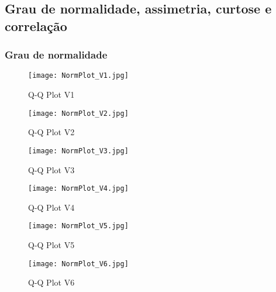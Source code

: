 \subsection[Subsection]{Grau de normalidade, assimetria, curtose e correlação}
\begin{frame}[shrink=30]
    \frametitle{Grau de normalidade}
    \vspace{3em}
    \begin{figure}[!tbp]
        \centering
            \begin{minipage}[b]{0.25\textwidth}
                \texttt{[image: NormPlot\_V1.jpg]}
                \caption{Q-Q Plot V1}
            \end{minipage}
            \begin{minipage}[b]{0.25\textwidth}
                \texttt{[image: NormPlot\_V2.jpg]}
                \caption{Q-Q Plot V2}
            \end{minipage}
            \begin{minipage}[b]{0.25\textwidth}
                \texttt{[image: NormPlot\_V3.jpg]}
                \caption{Q-Q Plot V3}
            \end{minipage}
            \begin{minipage}[b]{0.25\textwidth}
                \texttt{[image: NormPlot\_V4.jpg]}
                \caption{Q-Q Plot V4}
            \end{minipage}
            \begin{minipage}[b]{0.25\textwidth}
                \texttt{[image: NormPlot\_V5.jpg]}
                \caption{Q-Q Plot V5}
            \end{minipage}
            \begin{minipage}[b]{0.25\textwidth}
                \texttt{[image: NormPlot\_V6.jpg]}
                \caption{Q-Q Plot V6}
            \end{minipage}
    \end{figure}

\end{frame}

